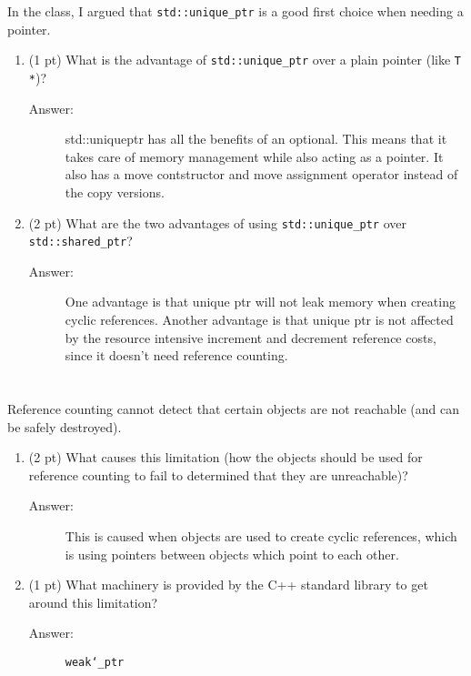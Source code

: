 \documentclass[11pt]{article}
\begin{document}
In the class, I argued that \texttt{std::unique\_ptr} is a good first choice when
needing a pointer.

\begin{enumerate}
\item (1 pt) What is the advantage of \texttt{std::unique\_ptr} over a plain pointer (like \texttt{T *})?

\begin{description}
    \item[Answer:] std::uniqueptr has all the benefits of an optional. This means that it takes care of memory management while also acting as a pointer. It also has a move contstructor and move assignment operator instead of the copy versions. 
\end{description}

\item (2 pt) What are the two advantages of using \texttt{std::unique\_ptr} over \texttt{std::shared\_ptr}?

\begin{description}
    \item[Answer:] One advantage is that unique ptr will not leak memory when creating cyclic references. Another advantage is that unique ptr is not affected by the resource intensive increment and decrement reference costs, since it doesn't need reference counting.
\end{description}

\end{enumerate}

\section{}
\label{sec:org99d1331}
Reference counting cannot detect that certain objects are not reachable (and can be safely destroyed).

\begin{enumerate}
\item (2 pt) What causes this limitation (how the objects should be used for reference counting to fail to determined that they are unreachable)?

\begin{description}
    \item[Answer:] This is caused when objects are used to create cyclic references, which is using pointers between objects which point to each other. 
\end{description}

\item (1 pt) What machinery is provided by the C++ standard library to get around this limitation?

\begin{description}
    \item[Answer:] \texttt{weak\char`_ptr}
\end{description}

\end{enumerate}
\end{document}
